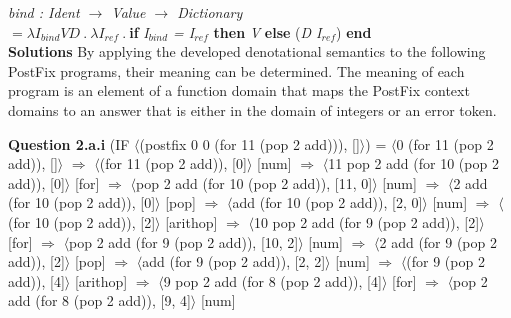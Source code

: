 \documentclass[12pt]{report}
\begin{document}
{\em bind : Ident $\rightarrow$ Value $\rightarrow$ Dictionary} \\
$=\lambda I_{bind}VD\:.\:\lambda I_{ref}\:.\:$\={\bf if} {\em I$_{bind}$ = I$_{ref}$} {\bf then} {\em V} {\bf else} ({\em D I$_{ref}$}) {\bf end} \\


{\bf Solutions} \newline
By applying the developed denotational semantics to the following PostFix programs, their meaning can be determined. The meaning of each program is an element of a function domain that maps the PostFix context domains to an answer that is either in the domain of integers or an error token.

{\bf Question 2.a.i} \newline
(IF $\langle$(postfix 0 0 (for 11 (pop 2 add))), []$\rangle$) \newline
= $\langle$0 (for 11 (pop 2 add)), []$\rangle$ \newline
$\Rightarrow$ $\langle$(for 11 (pop 2 add)), [0]$\rangle$ \hfill [num] \newline
$\Rightarrow$ $\langle$11 pop 2 add (for 10 (pop 2 add)), [0]$\rangle$ \hfill [for] \newline
$\Rightarrow$ $\langle$pop 2 add (for 10 (pop 2 add)), [11, 0]$\rangle$ \hfill [num] \newline
$\Rightarrow$ $\langle$2 add (for 10 (pop 2 add)), [0]$\rangle$ \hfill [pop] \newline
$\Rightarrow$ $\langle$add (for 10 (pop 2 add)), [2, 0]$\rangle$ \hfill [num] \newline
$\Rightarrow$ $\langle$(for 10 (pop 2 add)), [2]$\rangle$ \hfill [arithop] \newline
$\Rightarrow$ $\langle$10 pop 2 add (for 9 (pop 2 add)), [2]$\rangle$ \hfill [for] \newline
$\Rightarrow$ $\langle$pop 2 add (for 9 (pop 2 add)), [10, 2]$\rangle$ \hfill [num] \newline
$\Rightarrow$ $\langle$2 add (for 9 (pop 2 add)), [2]$\rangle$ \hfill [pop] \newline
$\Rightarrow$ $\langle$add (for 9 (pop 2 add)), [2, 2]$\rangle$ \hfill [num] \newline
$\Rightarrow$ $\langle$(for 9 (pop 2 add)), [4]$\rangle$ \hfill [arithop] \newline
$\Rightarrow$ $\langle$9 pop 2 add (for 8 (pop 2 add)), [4]$\rangle$ \hfill [for] \newline
$\Rightarrow$ $\langle$pop 2 add (for 8 (pop 2 add)), [9, 4]$\rangle$ \hfill [num] \newline
\end{document}
